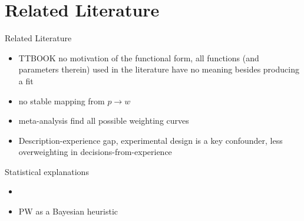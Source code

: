 \section[Literature]{Related Literature}
\begin{frame}{Related Literature}
\begin{itemize}
  \item TTBOOK no motivation of the functional form, all functions (and parameters therein) used in the literature have no meaning besides producing a fit
  \item no stable mapping from $ p \to w$ \parencite{StewartETAL2015}
  \item \textcite{UngemachETAL2009,WulffETAL2018} meta-analysis find all possible weighting curves
  \item Description-experience gap, experimental design is a key confounder, \ie less overweighting in decisions-from-experience \parencite{HertwigETAL2004,HertwigErev2009}
\end{itemize}

Statistical explanations
\begin{itemize}
  \item 
	\item PW as a Bayesian heuristic \parencite{Martins2006}
\end{itemize}  
\end{frame}


